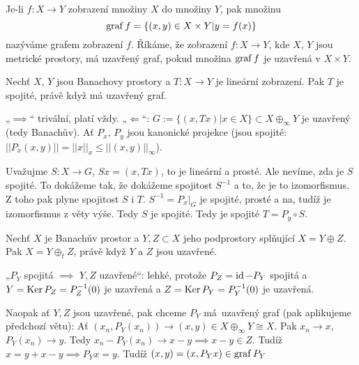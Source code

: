 \documentclass[12pt]{article}					%
\begin{document}
\begin{definice}[Graf]
	Je-li $f: X \rightarrow Y$ zobrazení množiny $X$ do množiny $Y$, pak množinu
	$$ \operatorname{graf} f = \{(x, y) \in X \times Y | y = f(x)\} $$
	nazýváme grafem zobrazení $f$. Říkáme, že zobrazení $f: X \rightarrow Y$, kde $X$, $Y$ jsou metrické prostory, má uzavřený graf, pokud množina $\operatorname{graf} f$ je uzavřená v $X \times Y$.
\end{definice}

\begin{veta}
	Nechť $X$, $Y$ jsou Banachovy prostory a $T: X \rightarrow Y$ je lineární zobrazení. Pak $T$ je spojité, právě když má uzavřený graf.

	\begin{dukazin}
		„$\implies$“ trivální, platí vždy. „$\Leftarrow$“: $G:= \{(x, Tx) | x \in X\} \subset X \oplus_∞ Y$ je uzavřený (tedy Banachův). Ať $P_x$, $P_y$ jsou kanonické projekce (jsou spojité: $||P_x(x, y)|| = ||x||_x ≤ ||(x, y)||_∞$).

		Uvažujme $S: X \rightarrow G$, $Sx = (x, Tx)$, to je lineární a prosté. Ale nevíme, zda je $S$ spojité. To dokážeme tak, že dokážeme spojitost $S^{-1}$ a to, že je to izomorfismus. Z toho pak plyne spojitost $S$ i $T$. $S^{-1} = P_x|_G$ je spojité, prosté a na, tudíž je izomorfismus z věty výše. Tedy $S$ je spojité. Tedy je spojité $T = P_y \circ S$.
	\end{dukazin}
\end{veta}

\begin{veta}
	Nechť $X$ je Banachův prostor a $Y, Z \subset X$ jeho podprostory splňující $X = Y \oplus Z$. Pak $X = Y\oplus_t Z$, právě když $Y$ a $Z$ jsou uzavřené.

	\begin{dukazin}
		„$P_Y$ spojitá $\implies$ $Y, Z$ uzavřené“: lehké, protože $P_Z = \operatorname{id} - P_Y$ spojitá a $Y = \operatorname{Ker} P_Z = P_Z^{-1}(0)$ je uzavřená a $Z = \operatorname{Ker} P_Y = P_Y^{-1}(0)$ je uzavřená.

		Naopak ať $Y, Z$ jsou uzavřené, pak chceme $P_Y$ má uzavřený graf (pak aplikujeme předchozí větu): Ať $(x_n, P_Y(x_n)) \rightarrow (x, y) \in X \oplus_∞ Y \cong X$. Pak $x_n \rightarrow x$, $P_Y(x_n) \rightarrow y$. Tedy $x_n - P_Y(x_n) \rightarrow x - y \implies x - y \in Z$. Tudíž $x = y + x - y \implies P_Y x = y$. Tudíž $(x, y) = (x, P_Yx) \in \operatorname{graf} P_Y$
	\end{dukazin}
\end{veta}
\end{document}
